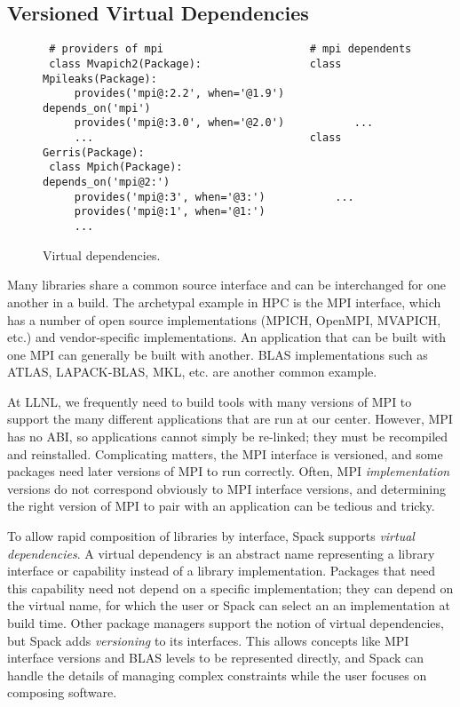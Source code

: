 
\subsection{Versioned Virtual Dependencies}\label{sec:virtual}

\begin{figure}
	\begin{verbatim}
 # providers of mpi                       # mpi dependents
 class Mvapich2(Package):                 class Mpileaks(Package):
     provides('mpi@:2.2', when='@1.9')        depends_on('mpi')
     provides('mpi@:3.0', when='@2.0')           ...
     ...                                  class Gerris(Package):
 class Mpich(Package):                        depends_on('mpi@2:')
     provides('mpi@:3', when='@3:')           ...
     provides('mpi@:1', when='@1:')
     ...
\end{verbatim}
\caption{
	Virtual dependencies.
	\label{fig:virtual-deps}
}
\end{figure}

Many libraries share a common source interface and can be interchanged for
one another in a build.
The archetypal example in HPC is the MPI interface, which has a number of
open source implementations (MPICH, OpenMPI, MVAPICH, etc.) and vendor-specific
implementations. An application that can be built with one MPI can generally be
built with another.  BLAS implementations such as ATLAS, LAPACK-BLAS, MKL, etc.
are another common example.

At LLNL, we frequently need to build tools with many versions of MPI to support
the many different applications that are run at our center.
However, MPI has no ABI, so applications cannot simply be re-linked;
they must be recompiled and reinstalled. 
Complicating matters, the MPI interface is versioned, and some
packages need later versions of MPI to run correctly.  Often, MPI
{\it implementation} versions do not correspond obviously to MPI
interface versions, and determining the right version of 
MPI to pair with an application can be tedious and tricky.

To allow rapid composition of libraries by interface, Spack supports
{\it virtual dependencies}.  A virtual dependency is an abstract name
representing a library interface or capability instead of a library 
implementation.  Packages that need this capability need not depend on 
a specific implementation; they can depend on the virtual name, for which
the user or Spack can select an an implementation at build time.
Other package managers support the notion of virtual dependencies, but Spack
adds {\it versioning} to its interfaces.  This allows concepts like MPI
interface versions and BLAS levels to be represented directly, and Spack can
handle the details of managing complex constraints while the user focuses on 
composing software.

